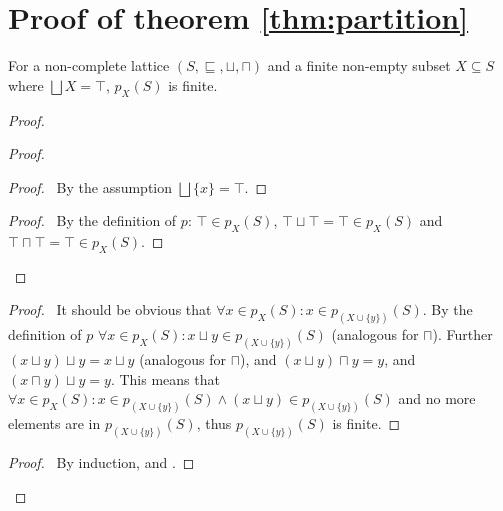\section{Proof of theorem \ref{thm:partition}}

\begin{lemma}\label{lem:finite-partition}
    For a non-complete lattice $(S, \sqsubseteq, \sqcup, \sqcap)$ and a finite non-empty subset $X \subseteq S$ where $\bigsqcup X = \top$, $p_X(S)$ is finite.
\end{lemma}

\begin{proof}
    \pf\
    \begin{proof}
        \begin{proof}
            \pf\ By the assumption $\bigsqcup \{x\} = \top$.
        \end{proof}
        \begin{proof}
            \pf\ By the definition of $p$: $\top \in p_X(S)$, $\top \sqcup \top = \top \in p_X(S)$ and $\top \sqcap \top = \top \in p_X(S)$.
        \end{proof}
    \end{proof}
    \begin{proof}
        \pf\ It should be obvious that $\forall x \in p_X(S) : x \in p_{(X \cup \{y\})}(S)$.
        By the definition of $p$ $\forall x \in p_X(S) : x \sqcup y \in p_{(X \cup \{y\})}(S)$ (analogous for $\sqcap$).
        Further $(x \sqcup y) \sqcup y = x \sqcup y$ (analogous for $\sqcap$), and $(x \sqcup y) \sqcap y = y$, and $(x \sqcap y) \sqcup y = y$.
        This means that $\forall x \in p_X(S) : x \in p_{(X \cup \{y\})}(S) \land (x \sqcup y) \in p_{(X \cup \{y\})}(S)$ and no more elements are in $p_{(X \cup \{y\})}(S)$, thus $p_{(X \cup \{y\})}(S)$ is finite.
    \end{proof}
    \qedstep
    \begin{proof}
        \pf\ By induction,  and .
    \end{proof}
\end{proof}

\partition*

